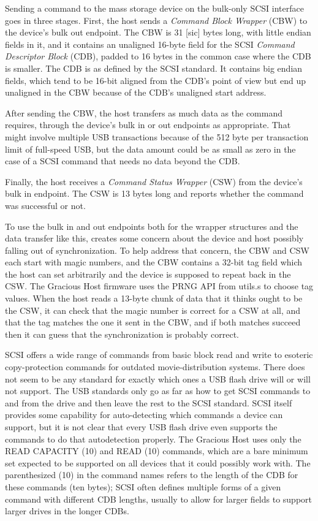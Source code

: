 Sending a command to the mass storage device on the bulk-only SCSI interface
goes in three stages.  First, the host sends a \emph{Command Block Wrapper}
(CBW) to the device's bulk out endpoint.  The CBW is 31 [sic] bytes long,
with little endian fields in it, and it contains an unaligned 16-byte field
for the SCSI \emph{Command Descriptor Block} (CDB), padded to 16 bytes in
the common case where the CDB is smaller.  The CDB is as defined by the SCSI
standard.  It contains big endian fields, which tend to be 16-bit aligned
from the CDB's point of view but end up unaligned in the CBW because of the
CDB's unaligned start address.

After sending the CBW, the host transfers as much data as the command
requires, through the device's bulk in or out endpoints as appropriate. 
That might involve multiple USB transactions because of the 512 byte per
transaction limit of full-speed USB, but the data amount could be as small
as zero in the case of a SCSI command that needs no data beyond the CDB.

Finally, the host receives a \emph{Command Status Wrapper} (CSW) from the
device's bulk in endpoint.  The CSW is 13 bytes long and reports whether the
command was successful or not.

To use the bulk in and out endpoints both for the wrapper structures and the
data transfer like this, creates some concern about the device and host
possibly falling out of synchronization.  To help address that concern, the
CBW and CSW each start with magic numbers, and the CBW contains a 32-bit tag
field which the host can set arbitrarily and the device is supposed to
repeat back in the CSW.  The Gracious Host firmware uses the PRNG API from
utils.s to choose tag values.  When the host reads a 13-byte chunk of data
that it thinks ought to be the CSW, it can check that the magic number is
correct for a CSW at all, and that the tag matches the one it sent in the
CBW, and if both matches succeed then it can guess that the synchronization
is probably correct.

SCSI offers a wide range of commands from basic block read and write to
esoteric copy-protection commands for outdated movie-distribution systems. 
There does not seem to be any standard for exactly which ones a USB flash
drive will or will not support.  The USB standards only go as far as how to
get SCSI commands to and from the drive and then leave the rest to the SCSI
standard.  SCSI itself provides some capability for auto-detecting which
commands a device can support, but it is not clear that every USB flash
drive even supports the commands to do that autodetection properly.  The
Gracious Host uses only the READ CAPACITY (10) and READ (10) commands, which
are a bare minimum set expected to be supported on all devices that it could
possibly work with.  The parenthesized (10) in the command names refers to
the length of the CDB for these commands (ten bytes); SCSI often defines
multiple forms of a given command with different CDB lengths, usually to
allow for larger fields to support larger drives in the longer CDBs.

